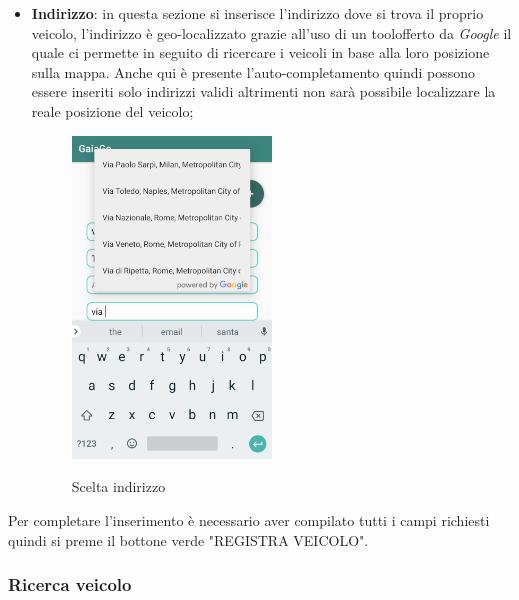 \begin{itemize}
\item \textbf{Indirizzo}: in questa sezione si inserisce l'indirizzo dove si trova il proprio veicolo, l'indirizzo è geo-localizzato grazie all'uso di un tool\glosp offerto da \textit{Google} il quale ci permette in seguito di ricercare i veicoli in base alla loro posizione sulla mappa. Anche qui è presente l'auto-completamento quindi possono essere inseriti solo indirizzi validi altrimenti non sarà possibile localizzare la reale posizione del veicolo;
 \begin{figure}[H] 
	\centering 
	\includegraphics[width=0.5\textwidth]{res/images/indirizzo_auto.png}\\
	\caption{Scelta indirizzo}
	\label{indirizzo}
\end{figure}
\end{itemize}
Per completare l'inserimento è necessario aver compilato tutti i campi richiesti quindi si preme il bottone verde "REGISTRA VEICOLO".
\pagebreak

\subsubsection{Ricerca veicolo}
\label{sec:hello}

